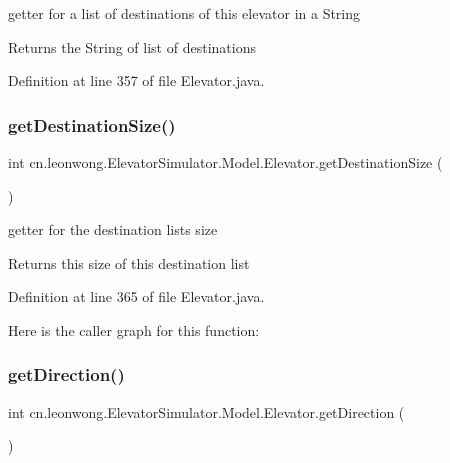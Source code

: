 getter for a list of destinations of this elevator in a String \begin{DoxyReturn}{Returns}
the String of list of destinations 
\end{DoxyReturn}


Definition at line 357 of file Elevator.\+java.

\mbox{\label{classcn_1_1leonwong_1_1_elevator_simulator_1_1_model_1_1_elevator_a8e71679aa5ed47ac62be7d4193f81055}} 
\subsubsection{\texorpdfstring{get\+Destination\+Size()}{getDestinationSize()}}
{\footnotesize\ttfamily int cn.\+leonwong.\+Elevator\+Simulator.\+Model.\+Elevator.\+get\+Destination\+Size (\begin{DoxyParamCaption}{ }\end{DoxyParamCaption})}

getter for the destination list\textquotesingle{}s size \begin{DoxyReturn}{Returns}
this size of this destination list 
\end{DoxyReturn}


Definition at line 365 of file Elevator.\+java.

Here is the caller graph for this function\+:
\mbox{\label{classcn_1_1leonwong_1_1_elevator_simulator_1_1_model_1_1_elevator_a0a386b72bfc7edf9a64dcc342dd27f51}} 
\subsubsection{\texorpdfstring{get\+Direction()}{getDirection()}}
{\footnotesize\ttfamily int cn.\+leonwong.\+Elevator\+Simulator.\+Model.\+Elevator.\+get\+Direction (\begin{DoxyParamCaption}{ }\end{DoxyParamCaption})}

